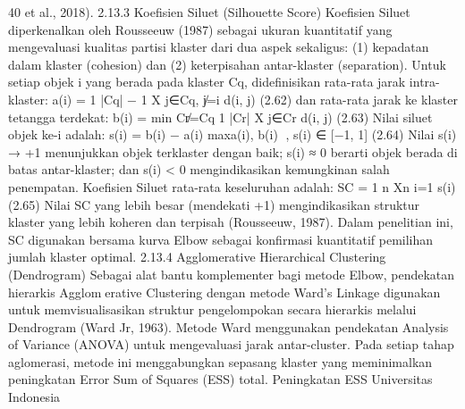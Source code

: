 40
et al., 2018).
2.13.3 Koefisien Siluet (Silhouette Score)
Koefisien Siluet diperkenalkan oleh Rousseeuw (1987) sebagai ukuran kuantitatif
yang mengevaluasi kualitas partisi klaster dari dua aspek sekaligus: (1) kepadatan dalam
klaster (cohesion) dan (2) keterpisahan antar-klaster (separation). Untuk setiap objek i
yang berada pada klaster Cq, didefinisikan rata-rata jarak intra-klaster:
a(i) = 1
|Cq| − 1
X
j∈Cq, j̸=i
d(i, j) (2.62)
dan rata-rata jarak ke klaster tetangga terdekat:
b(i) = min
Cr̸=Cq
1
|Cr|
X
j∈Cr
d(i, j) (2.63)
Nilai siluet objek ke-i adalah:
s(i) = b(i) − a(i)
maxa(i), b(i)
, s(i) ∈ [−1, 1] (2.64)
Nilai s(i) → +1 menunjukkan objek terklaster dengan baik; s(i) ≈ 0 berarti objek berada
di batas antar-klaster; dan s(i) < 0 mengindikasikan kemungkinan salah penempatan.
Koefisien Siluet rata-rata keseluruhan adalah:
SC =
1
n
Xn
i=1
s(i) (2.65)
Nilai SC yang lebih besar (mendekati +1) mengindikasikan struktur klaster yang lebih
koheren dan terpisah (Rousseeuw, 1987). Dalam penelitian ini, SC digunakan bersama
kurva Elbow sebagai konfirmasi kuantitatif pemilihan jumlah klaster optimal.
2.13.4 Agglomerative Hierarchical Clustering (Dendrogram)
Sebagai alat bantu komplementer bagi metode Elbow, pendekatan hierarkis Agglomerative Clustering dengan metode Ward’s Linkage digunakan untuk memvisualisasikan
struktur pengelompokan secara hierarkis melalui Dendrogram (Ward Jr, 1963). Metode
Ward menggunakan pendekatan Analysis of Variance (ANOVA) untuk mengevaluasi jarak
antar-cluster. Pada setiap tahap aglomerasi, metode ini menggabungkan sepasang klaster
yang meminimalkan peningkatan Error Sum of Squares (ESS) total. Peningkatan ESS
Universitas Indonesia

